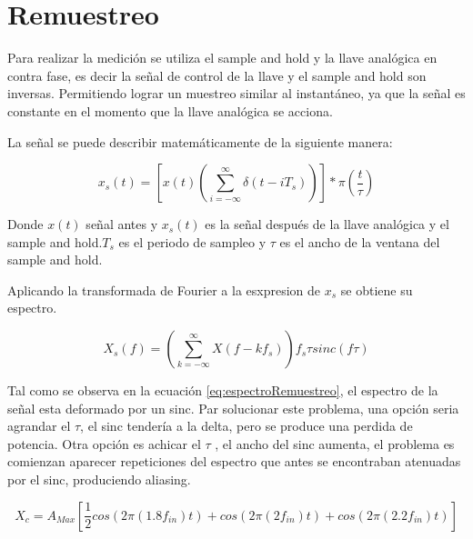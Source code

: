 \documentclass[../../ASSD_TP1_G7.tex]{subfiles}
\begin{document}
\chapter*{Remuestreo}
Para realizar la medición se utiliza el sample and hold y la llave analógica en contra fase, es decir la se\~nal de control de la llave y el sample and hold son inversas. Permitiendo lograr un muestreo similar al instantáneo, ya que la se\~nal es constante en el momento que la llave analógica se acciona.

La se\~nal se puede describir matemáticamente de la siguiente manera:

\begin{equation}
x_{s}(t)=\left[ x(t)\left( \sum_{i=-\infty}^{\infty} \delta(t - i T_s) \right) \right]* \pi(\frac{t}{\tau})
\end{equation}

\par Donde $x(t)$ se\~nal antes y $x_{s}(t)$ es la se\~nal después de la llave analógica y el sample and hold.$T_s$ es el periodo de sampleo y $\tau$ es el ancho de la ventana del sample and hold.
\par Aplicando la transformada de Fourier a la esxpresion de $x_{s}$ se obtiene su espectro.

\begin{equation}
X_{s}(f)=\left( \sum_{k=-\infty}^{\infty} X(f - k f _s) \right) f _s \tau sinc(f \tau) \label{eq:espectroRemuestreo}
\end{equation}

Tal como se observa en la ecuación \ref{eq:espectroRemuestreo}, el espectro de la se\~nal esta deformado por un sinc. Par solucionar este problema, una opción seria agrandar el $\tau$, el sinc tendería a la delta, pero se produce una perdida de potencia. Otra opción es achicar el $\tau$ , el ancho del sinc aumenta, el problema es comienzan aparecer repeticiones del espectro que antes se encontraban atenuadas por el sinc, produciendo aliasing.





\begin{equation}
X_c=A_{Max}[\frac{1}{2}cos(2\pi (1.8 f_{in})t)+cos(2\pi (2 f_{in})t)+cos(2\pi (2.2 f_{in})t)]
\end{equation}\label{eq:inputSignlanAM}
\end{document}
